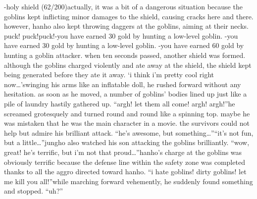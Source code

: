 -holy shield (62/200)actually, it was a bit of a dangerous situation because the goblins kept inflicting minor damages to the shield, causing cracks here and there.
however, hanho also kept throwing daggers at the goblins, aiming at their necks.
puck! puck!puck!-you have earned 30 gold by hunting a low-level goblin.
-you have earned 30 gold by hunting a low-level goblin.
-you have earned 60 gold by hunting a goblin attacker.
when ten seconds passed, another shield was formed.
 although the goblins charged violently and ate away at the shield, the shield kept being generated before they ate it away.
‘i think i’m pretty cool right now…’swinging his arms like an inflatable doll, he rushed forward without any hesitation.
 as soon as he moved, a number of goblins’ bodies lined up just like a pile of laundry hastily gathered up.
“argh! let them all come! argh! argh!”he screamed grotesquely and turned round and round like a spinning top.
 maybe he was mistaken that he was the main character in a movie.
the survivors could not help but admire his brilliant attack.
“he’s awesome, but something…”“it’s not fun, but a little…”jungho also watched his son attacking the goblins brilliantly.
“wow, great! he’s terrific, but i’m not that proud…”hanho’s charge at the goblins was obviously terrific because the defense line within the safety zone was completed thanks to all the aggro directed toward hanho.
“i hate goblins! dirty goblins! let me kill you all!”while marching forward vehemently, he suddenly found something and stopped.
“uh?”

